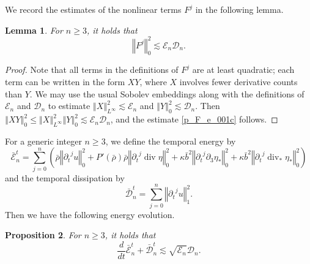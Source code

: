 \documentclass[a4paper,reqno,11pt]{amsart}
\numberwithin{equation}{section}
\providecommand{\norm}[1]{\left\Vert#1\right\Vert}
\providecommand{\sd}[1]{\mathcal{D}_{#1}}
\providecommand{\se}[1]{\mathcal{E}_{#1}}
\providecommand{\ns}[1]{\norm{#1}^2}
\providecommand{\norm}[1]{\left\Vert#1\right\Vert}
\newtheorem{lem}{Lemma}[section]
\newtheorem{prop}[lem]{Proposition}
\begin{document}
We record the estimates of the nonlinear terms $F^j$ in the following lemma.
\begin{lem}\label{p_F_estimatesc}
For $n\ge 3$, it holds that
\begin{equation}\label{p_F_e_001c}
\ns{ F^j}_{0}   {\lesssim}  \se{n} \sd{n}.
\end{equation}
\end{lem}
\begin{proof}
Note that all terms in the definitions of $F^{j}$ are at least quadratic; each term can be written in the form $X Y$, where $X$ involves fewer derivative counts than $Y$. We may use the usual Sobolev embeddings along with the definitions of $\se{n}$ and $\sd{n} $ to estimate $\norm{X}_{L^\infty}^2{\lesssim}  \se{n} $ and $\norm{Y}_{0}^2{\lesssim}   \sd{n} $.
Then $\norm{XY}_0^2\le \norm{X}_{L^\infty}^2\norm{Y}_{0}^2{\lesssim}   \se{n} \sd{n} $, and the estimate \eqref{p_F_e_001c} follows.
\end{proof}

For a generic integer $n\ge 3$, we define the temporal energy by
\begin{equation}
 \bar{\mathcal{E}}^{t}_{n} =
 \sum_{j=0}^{n} \left(\bar\rho \norm{{\partial_t}^j u}_0^2+P'(\bar\rho)\bar\rho \norm{{\partial_t}^j \operatorname{div} \eta}_0^2 +\kappa\bar b^2 \norm{{\partial_t}^j{\partial}_3\eta_\ast}_0^2
  +\kappa\bar b^2 \norm{{\partial_t}^j\operatorname{div}_\ast\eta_\ast}_0^2
 \right)
\end{equation}
and the temporal dissipation by
\begin{equation}
 \bar{\mathcal{D}}_n^{t} = \sum_{j=0}^{ n}  \norm{{\partial_t}^j u}_1^2.
\end{equation}
Then we have the following energy evolution.
\begin{prop}\label{i_temporal_evolution  Nc}
For $n\ge 3$, it holds that
\begin{equation} \label{i_te_0c}
  \frac{d}{dt} \bar{\mathcal{E}}_{n}^{t}
+ \bar{\mathcal{D}}_{n}^{t}
  {\lesssim}   \sqrt{\se{n} } \sd{ n}.
\end{equation}
\end{prop}
\end{document}
